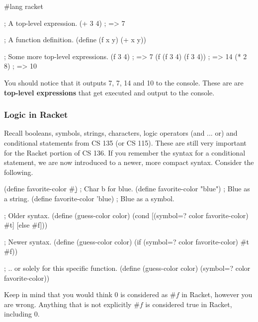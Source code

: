 
\begin{code}[Lisp]
#lang racket

; A top-level expression.
(+ 3 4) ; => 7

; A function definition.
(define (f x y)
	(+ x y))

; Some more top-level expressions.
(f 3 4) ; => 7
(f (f 3 4) (f 3 4)) ; => 14
(* 2 8) ; => 10
\end{code}

You should notice that it outputs 7, 7, 14 and 10 to the console. These are are \textbf{top-level expressions} that get executed and output to the console.

\subsubsection*{Logic in Racket}

Recall booleans, symbols, strings, characters, logic operators (and ... or) and conditional statements from CS 135 (or CS 115). These are still very important for the Racket portion of CS 136. If you remember the syntax for a conditional statement, we are now introduced to a newer, more compact syntax. Consider the following.\\


\begin{code}[Lisp]
(define favorite-color #\b) ; Char b for blue.
(define favorite-color "blue") ; Blue as a string.
(define favorite-color 'blue) ; Blue as a symbol.

; Older syntax.
(define (guess-color color)
	(cond
		[(symbol=? color favorite-color) #t]
		[else #f]))

; Newer syntax.
(define (guess-color color)
	(if (symbol=? color favorite-color) #t #f))

; .. or solely for this specific function.
(define (guess-color color)
	(symbol=? color favorite-color))
\end{code}

Keep in mind that you would think 0 is considered as $\#f$ in Racket, however you are wrong. Anything that is not explicitly $\#f$ is considered true in Racket, including 0.\\

